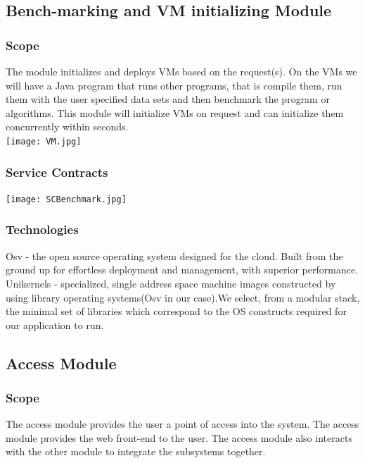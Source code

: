 \documentclass[runningheads,a4paper]{article}
\begin{document}
\subsection{Bench-marking and VM initializing Module}
\subsubsection{\textbf{Scope}}

The module initializes and deploys VMs based on the request(s). On the VMs we will have a Java program that runs other programs, that is compile them, run them with the user specified data sets and then benchmark the program or algorithms. This module will initialize VMs on request and can initialize them concurrently within seconds.\\

\texttt{[image: VM.jpg]}  \\
\subsubsection{\textbf{Service Contracts}}
\texttt{[image: SCBenchmark.jpg]}  \\
\subsubsection{\textbf{Technologies}}\newline
Osv - the open source operating system designed for the cloud. Built from the ground up for effortless deployment and management, with superior performance.\\

Unikernels - specialized, single address space machine images constructed by using library operating systems(Osv in our case).We select, from a modular stack, the minimal set of libraries which correspond to the OS constructs required for our application to run.\\

\subsection{Access Module}\newline
\subsubsection{\textbf{Scope}}
The access module provides the user a point of access into the system. The access module provides the web front-end to the user. The access module also interacts with the other module to integrate the subsystems together. 
\end{document}
